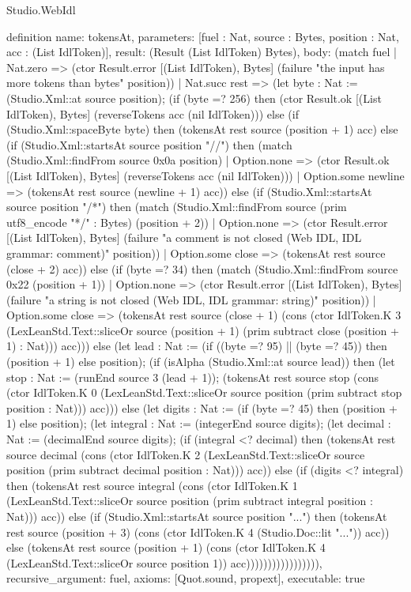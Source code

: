 \begin{lexlean}{Studio.WebIdl}
\begin{semanticmodule}
definition{
  name: tokensAt,
  parameters: [fuel : Nat, source : Bytes, position : Nat, acc : (List IdlToken)],
  result: (Result (List IdlToken) Bytes),
  body: (match fuel
    | Nat.zero => (ctor Result.error [(List IdlToken), Bytes] (failure "the input has more tokens than bytes" position))
    | Nat.succ rest => (let byte : Nat := (Studio.Xml::at source position); (if (byte =? 256) then (ctor Result.ok [(List IdlToken), Bytes] (reverseTokens acc (nil IdlToken))) else (if (Studio.Xml::spaceByte byte) then (tokensAt rest source (position + 1) acc) else (if (Studio.Xml::startsAt source position "//") then (match (Studio.Xml::findFrom source 0x0a position)
    | Option.none => (ctor Result.ok [(List IdlToken), Bytes] (reverseTokens acc (nil IdlToken)))
    | Option.some newline => (tokensAt rest source (newline + 1) acc)) else (if (Studio.Xml::startsAt source position "/*") then (match (Studio.Xml::findFrom source (prim utf8_encode "*/" : Bytes) (position + 2))
    | Option.none => (ctor Result.error [(List IdlToken), Bytes] (failure "a comment is not closed (Web IDL, IDL grammar: comment)" position))
    | Option.some close => (tokensAt rest source (close + 2) acc)) else (if (byte =? 34) then (match (Studio.Xml::findFrom source 0x22 (position + 1))
    | Option.none => (ctor Result.error [(List IdlToken), Bytes] (failure "a string is not closed (Web IDL, IDL grammar: string)" position))
    | Option.some close => (tokensAt rest source (close + 1) (cons (ctor IdlToken.K 3 (LexLeanStd.Text::sliceOr source (position + 1) (prim subtract close (position + 1) : Nat))) acc))) else (let lead : Nat := (if ((byte =? 95) || (byte =? 45)) then (position + 1) else position); (if (isAlpha (Studio.Xml::at source lead)) then (let stop : Nat := (runEnd source 3 (lead + 1)); (tokensAt rest source stop (cons (ctor IdlToken.K 0 (LexLeanStd.Text::sliceOr source position (prim subtract stop position : Nat))) acc))) else (let digits : Nat := (if (byte =? 45) then (position + 1) else position); (let integral : Nat := (integerEnd source digits); (let decimal : Nat := (decimalEnd source digits); (if (integral <? decimal) then (tokensAt rest source decimal (cons (ctor IdlToken.K 2 (LexLeanStd.Text::sliceOr source position (prim subtract decimal position : Nat))) acc)) else (if (digits <? integral) then (tokensAt rest source integral (cons (ctor IdlToken.K 1 (LexLeanStd.Text::sliceOr source position (prim subtract integral position : Nat))) acc)) else (if (Studio.Xml::startsAt source position "...") then (tokensAt rest source (position + 3) (cons (ctor IdlToken.K 4 (Studio.Doc::lit "...")) acc)) else (tokensAt rest source (position + 1) (cons (ctor IdlToken.K 4 (LexLeanStd.Text::sliceOr source position 1)) acc))))))))))))))))),
  recursive_argument: fuel,
  axioms: [Quot.sound, propext],
  executable: true
}


\end{semanticmodule}
\end{lexlean}

